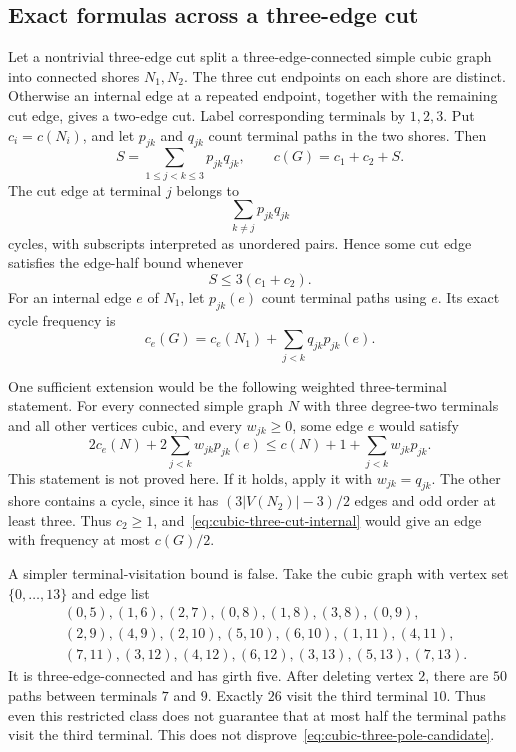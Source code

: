\subsection{Exact formulas across a three-edge cut}

Let a nontrivial three-edge cut split a three-edge-connected simple cubic graph into connected shores $N_1,N_2$.
The three cut endpoints on each shore are distinct.
Otherwise an internal edge at a repeated endpoint, together with the remaining cut edge, gives a two-edge cut.
Label corresponding terminals by $1,2,3$.
Put $c_i=c(N_i)$, and let $p_{jk}$ and $q_{jk}$ count terminal paths in the two shores.
Then
\begin{equation}\label{eq:cubic-three-cut}
 S=\sum_{1\le j<k\le3}p_{jk}q_{jk},\qquad
 c(G)=c_1+c_2+S.
\end{equation}
The cut edge at terminal $j$ belongs to
\[
 \sum_{k\ne j}p_{jk}q_{jk}
\]
cycles, with subscripts interpreted as unordered pairs.
Hence some cut edge satisfies the edge-half bound whenever
\[
 S\le3(c_1+c_2).
\]
For an internal edge $e$ of $N_1$, let $p_{jk}(e)$ count terminal paths using $e$.
Its exact cycle frequency is
\begin{equation}\label{eq:cubic-three-cut-internal}
 c_e(G)=c_e(N_1)+\sum_{j<k}q_{jk}p_{jk}(e).
\end{equation}

One sufficient extension would be the following weighted three-terminal statement.
For every connected simple graph $N$ with three degree-two terminals and all other vertices cubic, and every $w_{jk}\ge0$, some edge $e$ would satisfy
\begin{equation}\label{eq:cubic-three-pole-candidate}
 2c_e(N)+2\sum_{j<k}w_{jk}p_{jk}(e)
 \le c(N)+1+\sum_{j<k}w_{jk}p_{jk}.
\end{equation}
This statement is not proved here.
If it holds, apply it with $w_{jk}=q_{jk}$.
The other shore contains a cycle, since it has $(3|V(N_2)|-3)/2$ edges and odd order at least three.
Thus $c_2\ge1$, and~\eqref{eq:cubic-three-cut-internal} would give an edge with frequency at most $c(G)/2$.

A simpler terminal-visitation bound is false.
Take the cubic graph with vertex set $\{0,\ldots,13\}$ and edge list
\[
\begin{split}
 &(0,5),(1,6),(2,7),(0,8),(1,8),(3,8),(0,9),\\
 &(2,9),(4,9),(2,10),(5,10),(6,10),(1,11),(4,11),\\
 &(7,11),(3,12),(4,12),(6,12),(3,13),(5,13),(7,13).
\end{split}
\]
It is three-edge-connected and has girth five.
After deleting vertex $2$, there are $50$ paths between terminals $7$ and $9$.
Exactly $26$ visit the third terminal $10$.
Thus even this restricted class does not guarantee that at most half the terminal paths visit the third terminal.
This does not disprove~\eqref{eq:cubic-three-pole-candidate}.

